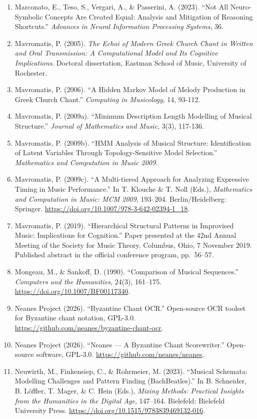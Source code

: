 \documentclass[11pt,a4paper]{article}
\begin{document}
\begin{enumerate}
\item
 Marconato, E., Teso, S., Vergari, A., \& Passerini, A. (2023). ``Not All Neuro-Symbolic Concepts Are Created Equal: Analysis and Mitigation of Reasoning Shortcuts.'' \emph{Advances in Neural Information Processing Systems}, 36.
\item
 Mavromatis, P. (2005). \emph{The Echoi of Modern Greek Church Chant in Written and Oral Transmission: A Computational Model and Its Cognitive Implications}. Doctoral dissertation, Eastman School of Music, University of Rochester.
\item
 Mavromatis, P. (2006). ``A Hidden Markov Model of Melody Production in Greek Church Chant.'' \emph{Computing in Musicology}, 14, 93-112.
\item
 Mavromatis, P. (2009a). ``Minimum Description Length Modelling of Musical Structure.'' \emph{Journal of Mathematics and Music}, 3(3), 117-136.
\item
 Mavromatis, P. (2009b). ``HMM Analysis of Musical Structure: Identification of Latent Variables Through Topology-Sensitive Model Selection.'' \emph{Mathematics and Computation in Music 2009}.
\item
 Mavromatis, P. (2009c). ``A Multi-tiered Approach for Analyzing Expressive Timing in Music Performance.'' In T. Klouche \& T. Noll (Eds.), \emph{Mathematics and Computation in Music: MCM 2009}, 193--204. Berlin/Heidelberg: Springer. \url{https://doi.org/10.1007/978-3-642-02394-1_18}.
\item
 Mavromatis, P. (2019). ``Hierarchical Structural Patterns in Improvised Music: Implications for Cognition.'' Paper presented at the 42nd Annual Meeting of the Society for Music Theory, Columbus, Ohio, 7 November 2019. Published abstract in the official conference program, pp.~56--57.
\item
 Mongeau, M., \& Sankoff, D. (1990). ``Comparison of Musical Sequences.'' \emph{Computers and the Humanities}, 24(3), 161--175. \url{https://doi.org/10.1007/BF00117340}.
\item
 Neanes Project (2026). ``Byzantine Chant OCR.'' Open-source OCR toolset for Byzantine chant notation, GPL-3.0. \url{https://github.com/neanes/byzantine-chant-ocr}.
\item
 Neanes Project (2026). ``Neanes --- A Byzantine Chant Scorewriter.'' Open-source software, GPL-3.0. \url{https://github.com/neanes/neanes}.
\item
 Neuwirth, M., Finkensiep, C., \& Rohrmeier, M. (2023). ``Musical Schemata: Modelling Challenges and Pattern Finding (BachBeatles).'' In B. Schneider, B. Löffler, T. Mager, \& C. Hein (Eds.), \emph{Mixing Methods: Practical Insights from the Humanities in the Digital Age}, 147--164. Bielefeld: Bielefeld University Press. \url{https://doi.org/10.1515/9783839469132-016}.

\end{enumerate}
\end{document}
